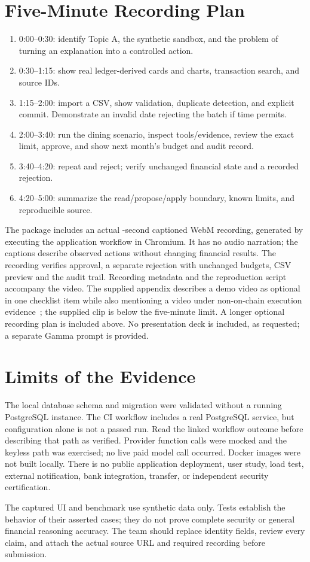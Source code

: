 \documentclass[conference,a4paper]{IEEEtran}
\begin{document}
\section{Five-Minute Recording Plan}
\begin{enumerate}
\item 0:00--0:30: identify Topic A, the synthetic sandbox, and the problem of turning an explanation into a controlled action.
\item 0:30--1:15: show real ledger-derived cards and charts, transaction search, and source IDs.
\item 1:15--2:00: import a CSV, show validation, duplicate detection, and explicit commit. Demonstrate an invalid date rejecting the batch if time permits.
\item 2:00--3:40: run the dining scenario, inspect tools/evidence, review the exact limit, approve, and show next month's budget and audit record.
\item 3:40--4:20: repeat and reject; verify unchanged financial state and a recorded rejection.
\item 4:20--5:00: summarize the read/propose/apply boundary, known limits, and reproducible source.
\end{enumerate}
The package includes an actual \DemoSeconds{}-second captioned WebM recording, generated by executing the application workflow in Chromium. It has no audio narration; the captions describe observed actions without changing financial results. The recording verifies approval, a separate rejection with unchanged budgets, CSV preview and the audit trail. Recording metadata and the reproduction script accompany the video. The supplied appendix describes a demo video as optional in one checklist item while also mentioning a video under non-on-chain execution evidence~\cite{competition}; the supplied clip is below the five-minute limit. A longer optional recording plan is included above. No presentation deck is included, as requested; a separate Gamma prompt is provided.

\section{Limits of the Evidence}
The local database schema and migration were validated without a running PostgreSQL instance. The CI workflow includes a real PostgreSQL service, but configuration alone is not a passed run. Read the linked workflow outcome before describing that path as verified. Provider function calls were mocked and the keyless path was exercised; no live paid model call occurred. Docker images were not built locally. There is no public application deployment, user study, load test, external notification, bank integration, transfer, or independent security certification.

The captured UI and benchmark use synthetic data only. Tests establish the behavior of their asserted cases; they do not prove complete security or general financial reasoning accuracy. The team should replace identity fields, review every claim, and attach the actual source URL and required recording before submission.

\FloatBarrier


\end{document}
